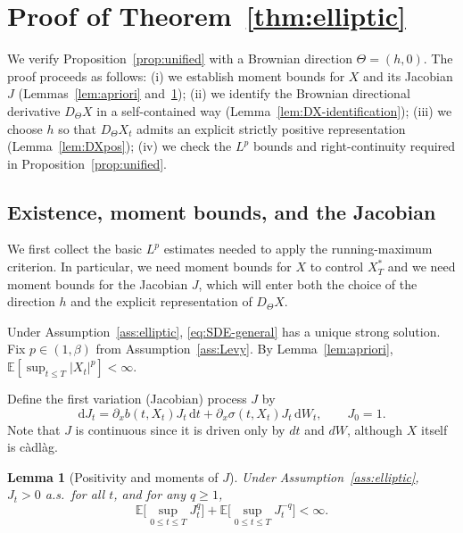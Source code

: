 \documentclass[11pt]{article}
\newcommand{\E}{\mathbb{E}}
\newcommand{\1}{\mathbf{1}}
\newcommand{\dd}{\mathrm{d}}
\newcommand{\dt}{\,\dd t}
\newcommand{\Xstar}{X^{\ast}}
\theoremstyle{plain}
\newtheorem{lemma}[theorem]{Lemma}
\theoremstyle{definition}
\theoremstyle{remark}
\begin{document}
\section{Proof of Theorem~\ref{thm:elliptic}}\label{sec:proof-elliptic}


We verify Proposition~\ref{prop:unified} with a Brownian direction $\Theta=(h,0)$.
The proof proceeds as follows:
(i) we establish moment bounds for $X$ and its Jacobian $J$ (Lemmas~\ref{lem:apriori} and~\ref{lem:J});
(ii) we identify the Brownian directional derivative $D_\Theta X$ in a self-contained way (Lemma~\ref{lem:DX-identification});
(iii) we choose $h$ so that $D_\Theta X_t$ admits an explicit strictly positive representation (Lemma~\ref{lem:DXpos});
(iv) we check the $L^p$ bounds and right-continuity required in Proposition~\ref{prop:unified}.


\subsection{Existence, moment bounds, and the Jacobian}

We first collect the basic $L^p$ estimates needed to apply the running-maximum criterion.
In particular, we need moment bounds for $X$ to control $\Xstar_T$ and we need moment bounds for the Jacobian $J$,
which will enter both the choice of the direction $h$ and the explicit representation of $D_\Theta X$.

Under Assumption~\ref{ass:elliptic}, \eqref{eq:SDE-general} has a unique strong solution.
Fix $p\in(1,\beta)$ from Assumption~\ref{ass:Levy}.
By Lemma~\ref{lem:apriori}, $\E[\sup_{t\le T}|X_t|^p]<\infty$.

Define the first variation (Jacobian) process $J$ by
\begin{equation}\label{eq:J}
\dd J_t=\partial_x b(t,X_t)J_t\dt+\partial_x\sigma(t,X_t)J_t\,\dd W_t,\qquad J_0=1.
\end{equation}
Note that $J$ is continuous since it is driven only by $dt$ and $dW$, although $X$ itself is c\`adl\`ag.

\begin{lemma}[Positivity and moments of $J$]\label{lem:J}
Under Assumption~\ref{ass:elliptic}, $J_t>0$ a.s.\ for all $t$, and for any $q\ge 1$,
\[
\E\Big[\sup_{0\le t\le T}J_t^{q}\Big]+\E\Big[\sup_{0\le t\le T}J_t^{-q}\Big]<\infty.
\]
\end{lemma}
\end{document}
